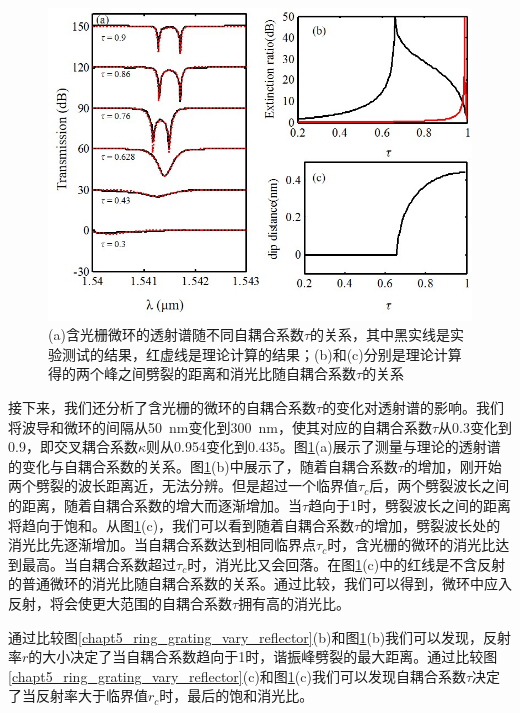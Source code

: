 \begin{figure}[htb]
	\centering
	\includegraphics[width=12cm]{./Pictures/chapt5_ring_grating_vary_tau.jpg}
	\caption{(a)含光栅微环的透射谱随不同自耦合系数$\tau$的关系，其中黑实线是实验测试的结果，红虚线是理论计算的结果；(b)和(c)分别是理论计算得的两个峰之间劈裂的距离和消光比随自耦合系数$\tau$的关系}
	\label{chapt5_ring_grating_vary_tau}
\end{figure}

接下来，我们还分析了含光栅的微环的自耦合系数$\tau$的变化对透射谱的影响。我们将波导和微环的间隔从50~nm变化到300~nm，使其对应的自耦合系数$\tau$从0.3变化到0.9，即交叉耦合系数$\kappa$则从0.954变化到0.435。图\ref{chapt5_ring_grating_vary_tau}(a)展示了测量与理论的透射谱的变化与自耦合系数的关系。图\ref{chapt5_ring_grating_vary_tau}(b)中展示了，随着自耦合系数$\tau$的增加，刚开始两个劈裂的波长距离近，无法分辨。但是超过一个临界值$\tau_c$后，两个劈裂波长之间的距离，随着自耦合系数的增大而逐渐增加。当$\tau$趋向于1时，劈裂波长之间的距离将趋向于饱和。从图\ref{chapt5_ring_grating_vary_tau}(c)，我们可以看到随着自耦合系数$\tau$的增加，劈裂波长处的消光比先逐渐增加。当自耦合系数达到相同临界点$\tau_c$时，含光栅的微环的消光比达到最高。当自耦合系数超过$\tau_c$时，消光比又会回落。在图\ref{chapt5_ring_grating_vary_tau}(c)中的红线是不含反射的普通微环的消光比随自耦合系数的关系。通过比较，我们可以得到，微环中应入反射，将会使更大范围的自耦合系数$\tau$拥有高的消光比。

通过比较图\ref{chapt5_ring_grating_vary_reflector}(b)和图\ref{chapt5_ring_grating_vary_tau}(b)我们可以发现，反射率$r$的大小决定了当自耦合系数趋向于1时，谐振峰劈裂的最大距离。通过比较图\ref{chapt5_ring_grating_vary_reflector}(c)和图\ref{chapt5_ring_grating_vary_tau}(c)我们可以发现自耦合系数$\tau$决定了当反射率大于临界值$r_c$时，最后的饱和消光比。

